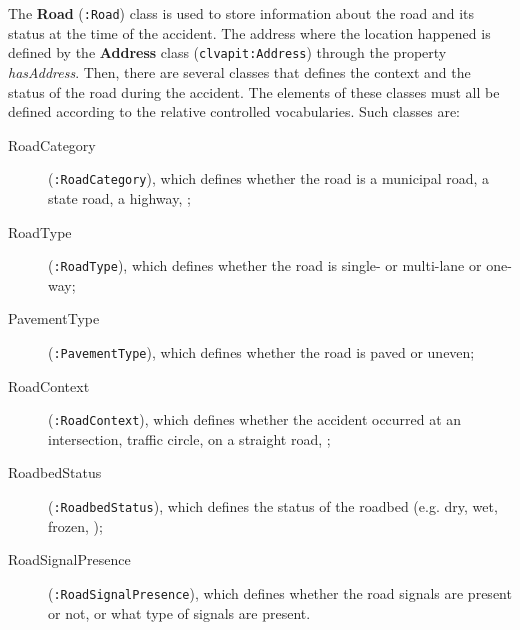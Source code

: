The \textbf{Road} (\verb#:Road#) class is used to store information about the road and its status at the time of the accident. The address where the location happened is defined by the \textbf{Address} class (\verb#clvapit:Address#) through the property \textit{hasAddress}. Then, there are several classes that defines the context and the status of the road during the accident. The elements of these classes must all be defined according to the relative controlled vocabularies. Such classes are:

\begin{description}
  \item[RoadCategory] (\verb#:RoadCategory#), which defines whether the road is a municipal road, a state road, a highway, \etc;
  \item[RoadType] (\verb#:RoadType#), which defines whether the road is single- or multi-lane or one-way;
  \item[PavementType] (\verb#:PavementType#), which defines whether the road is paved or uneven;
  \item[RoadContext] (\verb#:RoadContext#), which defines whether the accident occurred at an intersection, traffic circle, on a straight road, \etc;
  \item[RoadbedStatus] (\verb#:RoadbedStatus#), which defines the status of the roadbed (e.g. dry, wet, frozen, \etc);
  \item[RoadSignalPresence] (\verb#:RoadSignalPresence#), which defines whether the road signals are present or not, or what type of signals are present.
\end{description}

